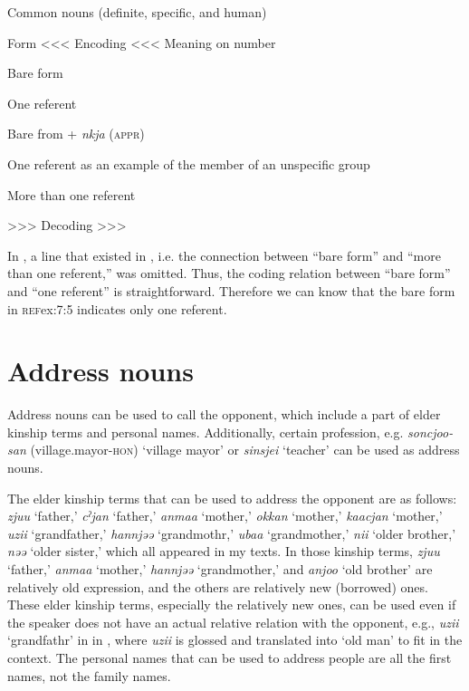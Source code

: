 \begin{table}
\caption{\label{tab:key:46} Common nouns (definite, specific, and human)}

Form  <<< Encoding <<<  Meaning on number

\ea
Bare form  %

\ea \label{ex:7:a}One referent

Bare from + \textit{nkja} (\textsc{appr})  %


\ex \label{ex:7:b}One referent as an example of the member of an unspecific group

  \ex \label{ex:7:c}More than one referent

  >>> Decoding >>>
  \z
\z
{}
\end{table}
In , a line that existed in , i.e. the connection between “bare form” and “more than one referent,” was omitted. Thus, the coding relation between “bare form” and “one referent” is straightforward. Therefore we can know that the bare form in \textsc{ref}{ex:7:5} indicates only one referent.

\section{Address nouns}

Address nouns can be used to call the opponent, which include a part of elder kinship terms and personal names. Additionally, certain profession, e.g. \textit{soncjoo-san} (village.mayor-\textsc{hon}) ‘village mayor’ or \textit{sinsjei} ‘teacher’ can be used as address nouns.

The elder kinship terms that can be used to address the opponent are as follows: \textit{zjuu} ‘father,’ \textit{cˀjan} ‘father,’ \textit{anmaa} ‘mother,’ \textit{okkan} ‘mother,’ \textit{kaacjan} ‘mother,’ \textit{uzii} ‘grandfather,’ \textit{hannjəə} ‘grandmothr,’ \textit{ubaa} ‘grandmother,’ \textit{nii} ‘older brother,’ \textit{nəə} ‘older sister,’ which all appeared in my texts. In those kinship terms, \textit{zjuu} ‘father,’ \textit{anmaa} ‘mother,’ \textit{hannjəə} ‘grandmother,’ and \textit{anjoo} ‘old brother’ are relatively old expression, and the others are relatively new (borrowed) ones. These elder kinship terms, especially the relatively new ones, can be used even if the speaker does not have an actual relative relation with the opponent, e.g., \textit{uzii} ‘grandfathr’ in  in , where \textit{uzii} is glossed and translated into ‘old man’ to fit in the context. The personal names that can be used to address people are all the first names, not the family names.

